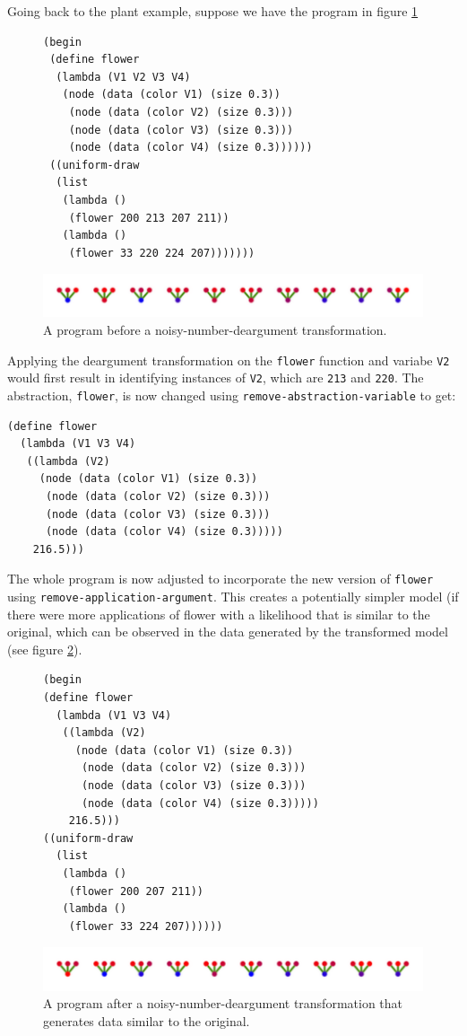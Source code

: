 \documentclass[a4paper,10pt]{article}
\begin{document}
Going back to the plant example, suppose we have the program in figure \ref{fig:noisyNumberProgram}
\begin{figure}[h]
\begin{verbatim}
(begin
 (define flower
  (lambda (V1 V2 V3 V4)
   (node (data (color V1) (size 0.3))
    (node (data (color V2) (size 0.3)))
    (node (data (color V3) (size 0.3)))
    (node (data (color V4) (size 0.3))))))
 ((uniform-draw
  (list
   (lambda ()
    (flower 200 213 207 211))
   (lambda ()
    (flower 33 220 224 207)))))))
\end{verbatim}
\begin{center}
\includegraphics[scale=.6]{noisyNumberProgram.pdf}
\end{center}
\label{fig:noisyNumberProgram}
\caption{A program before a noisy-number-deargument transformation.}
\end{figure}
Applying the deargument transformation on the \texttt{flower} function and variabe \texttt{V2} would first result in identifying instances of \texttt{V2}, which are \texttt{213} and \texttt{220}.  The abstraction, \texttt{flower}, is now changed using \texttt{remove-abstraction-variable} to get:
\begin{verbatim}
(define flower
  (lambda (V1 V3 V4)
   ((lambda (V2)
     (node (data (color V1) (size 0.3))
      (node (data (color V2) (size 0.3)))
      (node (data (color V3) (size 0.3)))
      (node (data (color V4) (size 0.3)))))
    216.5)))
\end{verbatim}
The whole program is now adjusted to incorporate the new version of \texttt{flower} using \texttt{remove-application-argument}.  This creates a potentially simpler model (if there were more applications of flower with a likelihood that is similar to the original, which can be observed in the data generated by the transformed model (see figure \ref{fig:noisyNumberTrans1}).
\begin{figure}[h]
\begin{verbatim}
(begin
(define flower
  (lambda (V1 V3 V4)
   ((lambda (V2)
     (node (data (color V1) (size 0.3))
      (node (data (color V2) (size 0.3)))
      (node (data (color V3) (size 0.3)))
      (node (data (color V4) (size 0.3)))))
    216.5)))
((uniform-draw
  (list
   (lambda ()
    (flower 200 207 211))
   (lambda ()
    (flower 33 224 207))))))
\end{verbatim}
\begin{center}
\includegraphics[scale=.6]{noisyNumberTrans1.pdf}
\end{center}
\label{fig:noisyNumberTrans1}
\caption{A program after a noisy-number-deargument transformation that generates data similar to the original.}
\end{figure}
\end{document}
